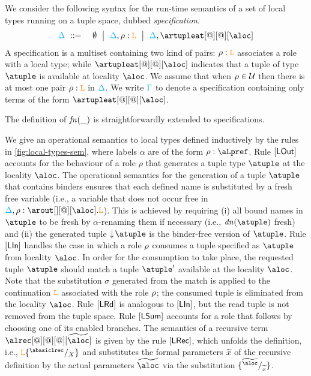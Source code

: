 We consider the following syntax for the run-time semantics of a set
of local types running on a tuple space, dubbed \emph{specification}.
%
\begin{eqnarray*}
  \envmv & \bnfdef & \emptyset \bnfmid
                  \envmv, \arole :  \aL \bnfmid
                  \envmv, \artupleat[@][@][\aloc]                  
\end{eqnarray*}
%
%
A specification is a multiset containing two kind of pairs:
$\rho : \texttt{\textcolor{orange}L}$ associates a role with a local type; while $\artupleat[@][@][\aloc]$
indicates that a tuple of type $\atuple$ is available at locality
$\aloc$.
%
We assume that when $\rho\in\mathcal{U}$ then there is at most one pair $\rho : \texttt{\textcolor{orange}L}$ in $\textcolor{cyan}{\Delta}$.
We write $\textcolor{cyan}{\Gamma}$ to denote a specification containing only
terms of the form $\artupleat[@][@][\aloc]$. 

The definition of ${\it fn}(\_)$ is straightforwardly  extended to specifications. 

We give an operational semantics to local types defined inductively by 
the rules in \cref{fig:local-types-sem}, where labels $\alpha$ are of the form 
$\arole : \aLpref$. Rule $\mathsf{[LOut]}$ 
accounts  for the behaviour of a role $\rho$ that  generates a tuple type $\atuple$ at the 
locality $\aloc$. The operational semantics for the generation of a tuple $\atuple$ that 
contains binders ensures that  each defined name  is substituted by a fresh free variable 
 (i.e., a variable that does not occur free in $\envmv, \arole : \arout[][@][\aloc].\aL$).
This is achieved by requiring  (i) all bound names in $\atuple$ to be fresh by $\alpha$-renaming them if necessary (i.e., $\dn\atuple$  fresh) and 
(ii)  the generated tuple $\eraseB\atuple$ is the binder-free version of $\atuple$. 
Rule $\mathsf{[LIn]}$ handles the case in which a role $\rho$
consumes  a tuple specified as $\atuple$ from locality $\aloc$. In order for the consumption to
take place, the  requested tuple $\atuple$ should match  a tuple $\atuple'$ available 
at the locality $\aloc$. 
Note that the substitution $\sigma$ generated from the match is applied 
to the continuation $\texttt{\textcolor{orange}L}$ associated with the role $\rho$; the
consumed tuple is eliminated from the locality $\aloc$. 
%
Rule $\mathsf{[LRd]}$ is analogous to $\mathsf{[LIn]}$, but the 
read tuple is not removed from the tuple space.
%
Rule $\mathsf{[LSum]}$ accounts for a role that follows by choosing one of 
its enabled branches. 
%
The semantics of a recursive term $\alrec[@][@][@][\seq \aloc]$ is
given by the rule $\mathsf{[LRec]}$, which unfolds the definition,
i.e., $\aL\sust X{\abasiclrec}$ and substitutes the formal parameters
$\widetilde{x}$ of the recursive definition by the actual parameters
$\seq\aloc$ via the substitution
$\sust {\seq x}{\seq \aloc}$.
 

